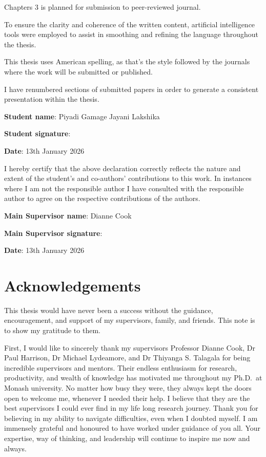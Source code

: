 \documentclass[
  11pt,
  a4paper,
]{report}
\begin{document}
Chapters 3 is planned for submission to peer-reviewed journal.

\clearpage

To ensure the clarity and coherence of the written content, artificial
intelligence tools were employed to assist in smoothing and refining the
language throughout the thesis.

This thesis uses American spelling, as that's the style followed by the
journals where the work will be submitted or published.

I have renumbered sections of submitted papers in order to generate a
consistent presentation within the thesis.

\textbf{Student name}: Piyadi Gamage Jayani Lakshika

\textbf{Student signature}:

\textbf{Date}: 13th January 2026

I hereby certify that the above declaration correctly reflects the
nature and extent of the student's and co-authors' contributions to this
work. In instances where I am not the responsible author I have
consulted with the responsible author to agree on the respective
contributions of the authors.

\textbf{Main Supervisor name}: Dianne Cook

\textbf{Main Supervisor signature}:

\textbf{Date}: 13th January 2026


\chapter*{Acknowledgements}\label{acknowledgements}


This thesis would have never been a success without the guidance,
encouragement, and support of my supervisors, family, and friends. This
note is to show my gratitude to them.

First, I would like to sincerely thank my supervisors Professor Dianne
Cook, Dr Paul Harrison, Dr Michael Lydeamore, and Dr Thiyanga S.
Talagala for being incredible supervisors and mentors. Their endless
enthusiasm for research, productivity, and wealth of knowledge has
motivated me throughout my Ph.D.~at Monash university. No matter how
busy they were, they always kept the doors open to welcome me, whenever
I needed their help. I believe that they are the best supervisors I
could ever find in my life long research journey. Thank you for
believing in my ability to navigate difficulties, even when I doubted
myself. I am immensely grateful and honoured to have worked under
guidance of you all. Your expertise, way of thinking, and leadership
will continue to inspire me now and always.
\end{document}
